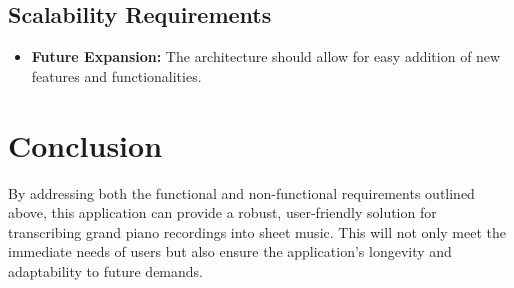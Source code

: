 \documentclass{article}
\begin{document}
\subsection{Scalability Requirements}
\begin{itemize}
    \item \textbf{Future Expansion:} The architecture should allow for easy addition of new features and functionalities.
\end{itemize}

\section{Conclusion}
By addressing both the functional and non-functional requirements outlined above, this application can provide a robust, user-friendly solution for transcribing grand piano recordings into sheet music. This will not only meet the immediate needs of users but also ensure the application's longevity and adaptability to future demands.
\end{document}
